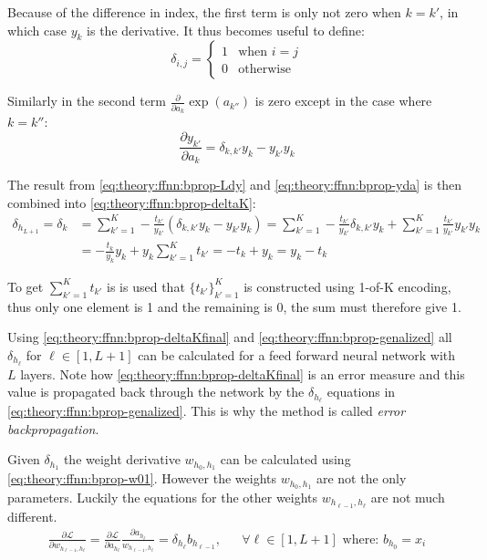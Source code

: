 Because of the difference in index, the first term is only not zero when $k = k'$, in which case $y_k$ is the derivative. It thus becomes useful to define:
\begin{equation}
\delta_{i,j} = \begin{cases}1& \text{when } i = j \\ 0 & \text{otherwise}\end{cases}
\end{equation}

Similarly in the second term $\frac{\partial}{\partial a_k} \exp(a_{k''})$ is zero except in the case where $k = k''$:
\begin{equation}
\frac{\partial y_{k'}}{\partial a_k} = \delta_{k, k'} y_k - y_{k'} y_k
\label{eq:theory:ffnn:bprop-yda}
\end{equation}

The result from \eqref{eq:theory:ffnn:bprop-Ldy} and \eqref{eq:theory:ffnn:bprop-yda} is then combined into \eqref{eq:theory:ffnn:bprop-deltaK}:
\begin{equation}
\begin{aligned}
\delta_{h_{L + 1}} = \delta_k &= \sum_{k'=1}^K -\frac{t_{k'}}{y_{k'}} \left( \delta_{k, k'} y_k - y_{k'} y_k \right) = \sum_{k'=1}^K -\frac{t_{k'}}{y_{k'}} \delta_{k, k'} y_k + \sum_{k'=1}^K \frac{t_{k'}}{y_{k'}} y_{k'} y_k \\
&= -\frac{t_k}{y_k} y_k + y_k \sum_{k'=1}^K t_{k'} = -t_k + y_k = y_k - t_k
\end{aligned}
\label{eq:theory:ffnn:bprop-deltaKfinal}
\end{equation}

To get $\sum_{k'=1}^K t_{k'}$ is is used that $\{ t_{k'} \}_{k'=1}^K$ is constructed using 1-of-K encoding, thus only one element is 1 and the remaining is 0, the sum must therefore give 1.

Using \eqref{eq:theory:ffnn:bprop-deltaKfinal} and \eqref{eq:theory:ffnn:bprop-genalized} all $\delta_{h_\ell}$ for $\ell \in [1, L+1]$ can be calculated for a feed forward neural network with $L$ layers. Note how \eqref{eq:theory:ffnn:bprop-deltaKfinal} is an error measure and this value is propagated back through the network by the $\delta_{h_\ell}$ equations in \eqref{eq:theory:ffnn:bprop-genalized}. This is why the method is called \textit{error backpropagation}.

Given $\delta_{h_1}$ the weight derivative $w_{h_0, h_1}$ can be calculated using \eqref{eq:theory:ffnn:bprop-w01}. However the weights $w_{h_0, h_1}$ are not the only parameters. Luckily the equations for the other weights $w_{h_{\ell-1}, h_\ell}$ are not much different.
\begin{equation}
\begin{aligned}
\frac{\partial \mathcal{L}}{\partial w_{h_{\ell-1}, h_\ell}} = \frac{\partial \mathcal{L}}{\partial a_{h_\ell}}
\frac{\partial a_{h_\ell}}{w_{h_{\ell-1}, h_\ell}} = \delta_{h_\ell} b_{h_{\ell-1}}, && \forall \ell \in [1, L+1] \text{ where: } b_{h_0} = x_i
\end{aligned}
\end{equation}
